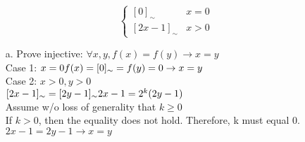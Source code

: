 \documentclass[12pt]{article}
\begin{document}
\begin{enumerate}
\begin{enumerate}
\[\begin{cases}
            [0]_\sim & x=0 \\
            [2x-1]_\sim & x>0 
          \end{cases}
        \]
        \begin{enumerate}
          \item[a.] Prove injective: $\forall x,y, f(x)=f(y) \rightarrow x=y$
            \\ Case 1: $x=0
            \\ f(x) = [0]_\sim =f(y)=0\rightarrow x=y$
            \\ Case 2: $x>0, y>0$
            \\ $[2x-1]_\sim = [2y-1]_\sim
            \\ 2x-1 = 2^k(2y-1)$
            \\ Assume w/o loss of generality that $k\geq 0$ 
            \\ If $k > 0$, then the equality does not hold. Therefore, k must equal 0.
            \\ $2x-1 = 2y-1 \rightarrow x=y$
        \end{enumerate}
    \end{enumerate}
\end{enumerate}
\end{document}
